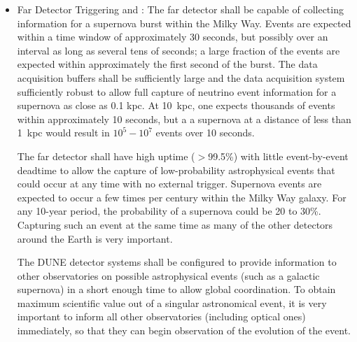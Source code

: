 \begin{itemize}


\item Far Detector Triggering and :  The far detector shall be capable of collecting information for a supernova burst within the Milky Way.  Events are expected within a time window of approximately 30 seconds, but possibly over an interval as long as several tens of seconds; a large fraction of the events are expected within approximately the first second of the burst.
The data acquisition buffers shall be sufficiently large and the data acquisition system sufficiently robust to allow full capture of neutrino event information for a supernova as close as 0.1 kpc.
At 10~kpc, one expects thousands of events within approximately 10 seconds, but a a supernova at a distance of less than 1~kpc would result in $10^5-10^7$  events over 10 seconds.    

The far detector shall have high uptime ($>$99.5\%) with little event-by-event deadtime to allow the capture of low-probability astrophysical events that could occur at any time with no external trigger. 
Supernova events are expected to occur a few times per century within the Milky Way galaxy. For any 10-year period, the probability of a supernova could be 20 to 30\%.  Capturing such an event at the same time as many of the other detectors around the Earth is very important.  

The DUNE detector systems shall be configured to provide  information to other observatories on possible astrophysical events (such as a galactic supernova) in a short enough time to allow global coordination.   
To obtain maximum scientific value out of a singular astronomical event, it is very important to inform all other observatories (including optical ones) immediately, so that they can begin observation of the evolution of the event. 


\end{itemize}
